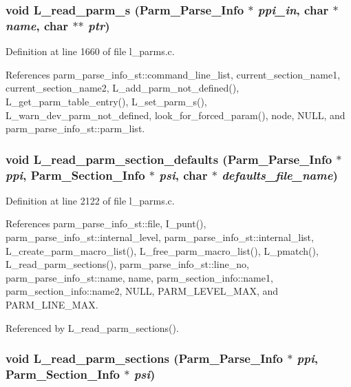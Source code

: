 \subsubsection{\setlength{\rightskip}{0pt plus 5cm}void L\_\-read\_\-parm\_\-s (\bf{Parm\_\-Parse\_\-Info} $\ast$ {\em ppi\_\-in}, char $\ast$ {\em name}, char $\ast$$\ast$ {\em ptr})}\label{l__parms_8c_17491a48ac859e9eed6815fc3ff723d9}




Definition at line 1660 of file l\_\-parms.c.

References parm\_\-parse\_\-info\_\-st::command\_\-line\_\-list, current\_\-section\_\-name1, current\_\-section\_\-name2, L\_\-add\_\-parm\_\-not\_\-defined(), L\_\-get\_\-parm\_\-table\_\-entry(), L\_\-set\_\-parm\_\-s(), L\_\-warn\_\-dev\_\-parm\_\-not\_\-defined, look\_\-for\_\-forced\_\-param(), node, NULL, and parm\_\-parse\_\-info\_\-st::parm\_\-list.
\subsubsection{\setlength{\rightskip}{0pt plus 5cm}void L\_\-read\_\-parm\_\-section\_\-defaults (\bf{Parm\_\-Parse\_\-Info} $\ast$ {\em ppi}, \bf{Parm\_\-Section\_\-Info} $\ast$ {\em psi}, char $\ast$ {\em defaults\_\-file\_\-name})}\label{l__parms_8c_b374997ea213e0a415182ce94e5a3cf8}




Definition at line 2122 of file l\_\-parms.c.

References parm\_\-parse\_\-info\_\-st::file, I\_\-punt(), parm\_\-parse\_\-info\_\-st::internal\_\-level, parm\_\-parse\_\-info\_\-st::internal\_\-list, L\_\-create\_\-parm\_\-macro\_\-list(), L\_\-free\_\-parm\_\-macro\_\-list(), L\_\-pmatch(), L\_\-read\_\-parm\_\-sections(), parm\_\-parse\_\-info\_\-st::line\_\-no, parm\_\-parse\_\-info\_\-st::name, name, parm\_\-section\_\-info::name1, parm\_\-section\_\-info::name2, NULL, PARM\_\-LEVEL\_\-MAX, and PARM\_\-LINE\_\-MAX.

Referenced by L\_\-read\_\-parm\_\-sections().
\subsubsection{\setlength{\rightskip}{0pt plus 5cm}void L\_\-read\_\-parm\_\-sections (\bf{Parm\_\-Parse\_\-Info} $\ast$ {\em ppi}, \bf{Parm\_\-Section\_\-Info} $\ast$ {\em psi})}\label{l__parms_8c_13f4fc5e49389c952f6c36b2b36d0765}




